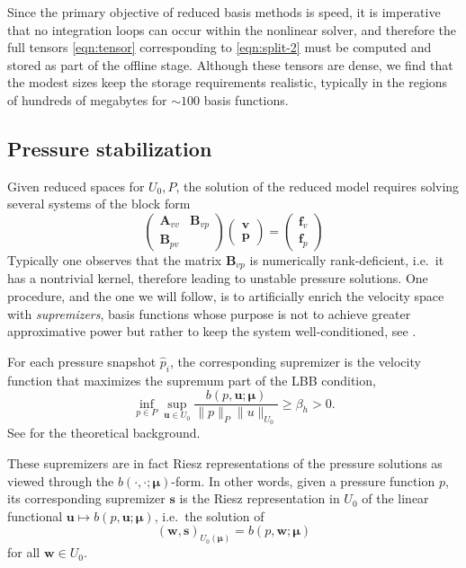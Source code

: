 \documentclass[onecolumn, twoside, a4paper, 11pt]{article}
\begin{document}
Since the primary objective of reduced basis methods is speed, it is imperative
that no integration loops can occur within the nonlinear solver, and therefore
the full tensors \eqref{eqn:tensor} corresponding to \eqref{eqn:split-2} must be
computed and stored as part of the offline stage. Although these tensors are
dense, we find that the modest sizes keep the storage requirements realistic,
typically in the regions of hundreds of megabytes for $\sim 100$ basis
functions.

\subsection{Pressure stabilization}
\label{sec:stab}

Given reduced spaces for $U_0,P$, the solution of the reduced model requires
solving several systems of the block form
\begin{equation}
  \label{eqn:sys-instab}
  \begin{pmatrix} \bm A_{vv} & \bm B_{vp} \\ \bm B_{pv} \end{pmatrix}
  \begin{pmatrix} \bm v \\ \bm p \end{pmatrix}
  =
  \begin{pmatrix} \bm f_v \\ \bm f_p \end{pmatrix}
\end{equation}
Typically one observes that the matrix $\bm B_{vp}$ is numerically
rank-deficient, i.e.~it has a nontrivial kernel, therefore leading to unstable
pressure solutions. One procedure, and the one we will follow, is to
artificially enrich the velocity space with \emph{supremizers}, basis functions
whose purpose is not to achieve greater approximative power but rather to keep
the system well-conditioned, see \cite{Ballarin2015ssp}.

For each pressure snapshot $\hat{p}_i$, the corresponding supremizer is the
velocity function that maximizes the supremum part of the LBB condition,
\begin{equation}
  \label{eqn:lbb}
  \inf_{p \in P} \sup_{\bm u \in U_0}
  \frac{b(p, \bm u; \bm \mu)}{\|p\|_P \|u\|_{U_0}} \geq \beta_h > 0.
\end{equation}
See \cite{Ballarin2015ssp} for the theoretical background.

These supremizers are in fact Riesz representations of the pressure solutions as
viewed through the $b(\cdot,\cdot;\bm \mu)$-form. In other words, given a
pressure function $p$, its corresponding supremizer $\bm s$ is the Riesz
representation in $U_0$ of the linear functional $\bm u \mapsto b(p, \bm u; \bm
\mu)$, i.e.~the solution of
\begin{equation}
  \label{eqn:riesz}
  \left( \bm w, \bm s \right)_{U_0(\bm \mu)} = b(p, \bm w; \bm \mu)
\end{equation}
for all $\bm w \in U_0$.
\end{document}
